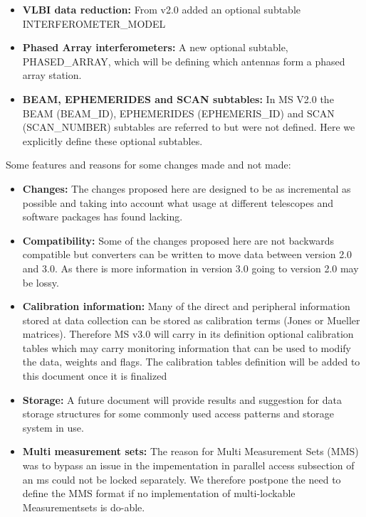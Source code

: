 \documentclass{article}
\begin{document}
\begin{itemize}
\item{{\bf VLBI data reduction:} From v2.0 added an optional subtable
    INTERFEROMETER\_MODEL}

\item{{\bf Phased Array interferometers:} A new optional subtable,
    PHASED\_ARRAY, which will be defining which antennas form a phased
    array station.}

\item{{\bf BEAM, EPHEMERIDES and SCAN subtables:} In MS V2.0 the BEAM
  (BEAM\_ID), EPHEMERIDES (EPHEMERIS\_ID) and SCAN (SCAN\_NUMBER)
  subtables are referred to but were not defined. Here we explicitly
  define these optional subtables.}


\end{itemize}



Some features and reasons for some changes made and not made:

\begin{itemize}

\item{{\bf Changes:} The changes proposed here are designed
  to be as incremental as possible and taking into account what usage
  at different telescopes and software packages has found lacking.}

\item{{\bf Compatibility:} Some of the changes proposed here are not
  backwards compatible but converters can be written to move data between
  version 2.0 and 3.0. As there is more information in version 3.0
  going to version 2.0 may be lossy.}

\item{{\bf Calibration information:} Many of the direct and peripheral
  information stored at data collection can be stored as calibration
  terms (Jones or Mueller matrices). Therefore MS v3.0 will carry in
  its definition optional calibration tables which may carry
  monitoring information that can be used to modify the data, weights
  and flags. The calibration tables definition will be added to this
  document once it is finalized }

\item{{\bf Storage:} A future document will provide results and
    suggestion for data storage structures for some commonly used
    access patterns and storage system in use.}

\item{{\bf Multi measurement sets:} The reason for Multi Measurement
  Sets (MMS) was to bypass an issue in the impementation in parallel
  access subsection of an ms could not be locked separately. We
  therefore postpone the need to define the MMS format if no
  implementation of multi-lockable Measurementsets is do-able. }


\end{itemize}
\end{document}

